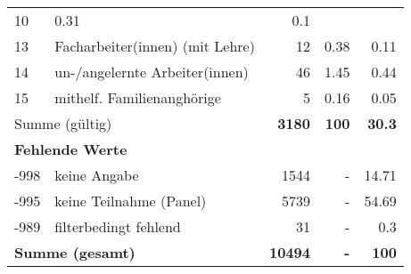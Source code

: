 \begin{longtable}{lXrrr}
       \num{10} &
       \num[round-mode=places,round-precision=2]{0,31} &
         \num[round-mode=places,round-precision=2]{0,1} \\

     13 &
     \multicolumn{1}{X}{ Facharbeiter(innen) (mit Lehre)   } &


       \num{12} &
       \num[round-mode=places,round-precision=2]{0,38} &
         \num[round-mode=places,round-precision=2]{0,11} \\

     14 &
     \multicolumn{1}{X}{ un-/angelernte Arbeiter(innen)   } &


       \num{46} &
       \num[round-mode=places,round-precision=2]{1,45} &
         \num[round-mode=places,round-precision=2]{0,44} \\

     15 &
     \multicolumn{1}{X}{ mithelf. Familienanghörige   } &


       \num{5} &
       \num[round-mode=places,round-precision=2]{0,16} &
         \num[round-mode=places,round-precision=2]{0,05} \\
     \midrule
     \multicolumn{2}{l}{Summe (gültig)} &
       \textbf{\num{3180}} &
     \textbf{100} &
       \textbf{\num[round-mode=places,round-precision=2]{30,3}} \\
     \multicolumn{5}{l}{\textbf{Fehlende Werte}}\\
       -998 &
       keine Angabe &
         \num{1544} &
        - &
         \num[round-mode=places,round-precision=2]{14,71} \\
       -995 &
       keine Teilnahme (Panel) &
         \num{5739} &
        - &
         \num[round-mode=places,round-precision=2]{54,69} \\
       -989 &
       filterbedingt fehlend &
         \num{31} &
        - &
         \num[round-mode=places,round-precision=2]{0,3} \\
     \midrule
     \multicolumn{2}{l}{\textbf{Summe (gesamt)}} &
          \textbf{\num{10494}} &
        \textbf{-} &
        \textbf{100} \\
     \bottomrule
     \end{longtable}
     
